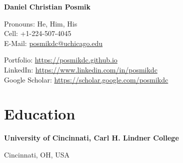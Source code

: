 \documentclass[a4paper,20pt]{article}
\begin{document}
\nocite{*}


\begin{center}
	\textbf{{\LARGE \color{black} Daniel Christian Posmik}}
\end{center}
\vspace{2pt}

	\begin{minipage}{.45\linewidth} 
		\begin{flushleft}
    			Pronouns: He, Him, His \\ 
    			Cell: +1-224-507-4045 \\
    			E-Mail: \href{mailto:posmikdc@uchicago.edu} {posmikdc@uchicago.edu}
    		\end{flushleft} 
    	\end{minipage}
    \hfill 
    \begin{minipage}{.50\linewidth}
    		\begin{flushright}
                        Portfolio: \href{https://posmikdc.github.io/}
                        {https://posmikdc.github.io} \\
            	 	LinkedIn: \href{https://www.linkedin.com/in/posmikdc/}           {https://www.linkedin.com/in/posmikdc} \\
    	 		Google Scholar: \href{https://scholar.google.com/citations?hl=en&user=sRuEm5oAAAAJ}{https://scholar.google.com/posmikdc} 
    		\end{flushright}
    	\end{minipage}

\vspace{5pt}


\section{Education}
    \begin{minipage}{.75\linewidth} \begin{flushleft}
    		\textbf{University of Cincinnati, Carl H. Lindner College}
    	\end{flushleft} \end{minipage}
    \hfill 
    \begin{minipage}{.20\linewidth}\begin{flushright}
    	 Cincinnati, OH, USA
    	\end{flushright}\end{minipage}
    	
\end{document}
